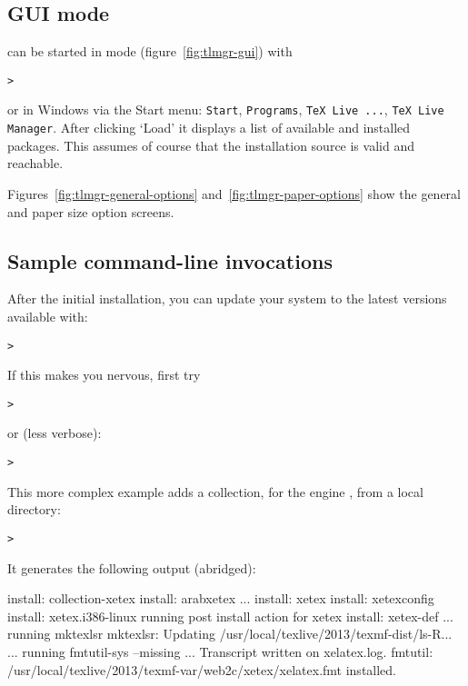 \documentclass{article}
\begin{document}
\subsection{ GUI mode}
 can be started in \GUI{} mode (figure~\ref{fig:tlmgr-gui}) with
\begin{alltt}
> 
\end{alltt}
or in Windows via the Start menu: \texttt{Start}, \texttt{Programs},
\texttt{TeX Live ...}, \texttt{TeX Live Manager}. After clicking `Load'
it displays a list of available and installed packages.  This assumes of
course that the installation source is valid and reachable.

Figures~\ref{fig:tlmgr-general-options} and~\ref{fig:tlmgr-paper-options}
show the general and paper size option screens.

\subsection{Sample  command-line invocations}

After the initial installation, you can update your system to the latest
versions available with:
\begin{alltt}
> 
\end{alltt}
If this makes you nervous, first try
\begin{alltt}
> 
\end{alltt}
or (less verbose):
\begin{alltt}
> 
\end{alltt}

This more complex example adds a collection, for the engine \XeTeX, from
a local directory:

\begin{alltt}
> 
\end{alltt}
It generates the following output (abridged):
\begin{fverbatim}
install: collection-xetex
install: arabxetex
...
install: xetex
install: xetexconfig
install: xetex.i386-linux
running post install action for xetex
install: xetex-def
...
running mktexlsr
mktexlsr: Updating /usr/local/texlive/2013/texmf-dist/ls-R...
...
running fmtutil-sys --missing
...
Transcript written on xelatex.log.
fmtutil: /usr/local/texlive/2013/texmf-var/web2c/xetex/xelatex.fmt installed.
\end{fverbatim}
\end{document}
